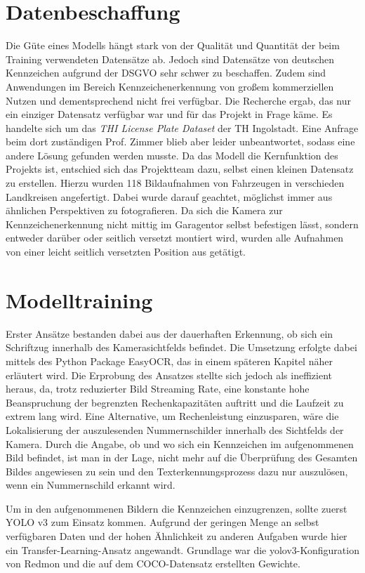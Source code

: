 \section{Datenbeschaffung}
Die Güte eines Modells hängt stark von der Qualität und Quantität der beim Training verwendeten Datensätze ab. Jedoch sind Datensätze von deutschen Kennzeichen aufgrund der \ac{DSGVO} sehr schwer zu beschaffen. Zudem sind Anwendungen im Bereich Kennzeichenerkennung von großem kommerziellen Nutzen und dementsprechend nicht frei verfügbar. Die Recherche ergab, das nur ein einziger Datensatz verfügbar war und für das Projekt in Frage käme. Es handelte sich um das \textit{THI License Plate Dataset} der TH Ingolstadt.\autocite[Vgl.][]{thilp} Eine Anfrage beim dort zuständigen Prof. Zimmer blieb aber leider unbeantwortet, sodass eine andere Lösung gefunden werden musste.
Da das Modell die Kernfunktion des Projekts ist, entschied sich das Projektteam dazu, selbst einen kleinen Datensatz zu erstellen. 
Hierzu wurden 118 Bildaufnahmen von Fahrzeugen in verschieden Landkreisen angefertigt. Dabei wurde darauf geachtet, möglichst immer aus ähnlichen Perspektiven zu fotografieren. Da sich die Kamera zur Kennzeichenerkennung nicht mittig im Garagentor selbst befestigen lässt, sondern entweder darüber oder seitlich versetzt montiert wird, wurden alle Aufnahmen von einer leicht seitlich versetzten Position aus getätigt.

\section{Modelltraining}


Erster Ansätze bestanden dabei aus der dauerhaften Erkennung, ob sich ein Schriftzug innerhalb des Kamerasichtfelds befindet. Die Umsetzung erfolgte dabei mittels des Python Package EasyOCR, das in einem späteren Kapitel näher erläutert wird. Die Erprobung des Ansatzes stellte sich jedoch als ineffizient heraus, da, trotz reduzierter Bild Streaming Rate, eine konstante hohe Beanspruchung der begrenzten Rechenkapazitäten auftritt und die Laufzeit zu extrem lang wird.
Eine Alternative, um Rechenleistung einzusparen, wäre die Lokalisierung der auszulesenden Nummernschilder innerhalb des Sichtfelds der Kamera. Durch die Angabe, ob und wo sich ein Kennzeichen im aufgenommenen Bild befindet, ist man in der Lage, nicht mehr auf die Überprüfung des Gesamten Bildes angewiesen zu sein und den Texterkennungsprozess dazu nur auszulösen, wenn ein Nummernschild erkannt wird.

Um in den aufgenommenen Bildern die Kennzeichen einzugrenzen, sollte zuerst YOLO v3 zum Einsatz kommen. Aufgrund der geringen Menge an selbst verfügbaren Daten und der hohen Ähnlichkeit zu anderen Aufgaben wurde hier ein Transfer-Learning-Ansatz angewandt. Grundlage war die yolov3-Konfiguration von Redmon und die auf dem COCO-Datensatz erstellten Gewichte.

